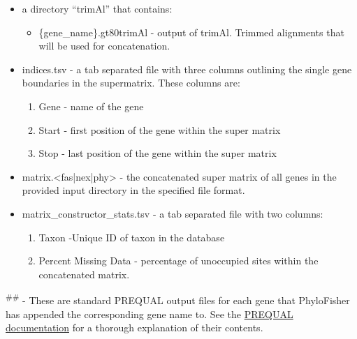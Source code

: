 \documentclass{article}
\begin{document}
\begin{description}
\begin{description}
\begin{itemize}
\begin{itemize}
\begin{itemize}
\begin{itemize}
                            \end{itemize}
                            \item a directory “trimAl” that contains:
                            \begin{itemize}
                                \item \{gene\_name\}.gt80trimAl - output of trimAl. Trimmed alignments that will be used for concatenation.
                            \end{itemize}
                            \item indices.tsv - a tab separated file with three columns outlining the single gene boundaries in the supermatrix. These columns are:
                            \begin{enumerate}
                                \item Gene - name of the gene
                                \item Start - first position of the gene within the super matrix
                                \item Stop - last position of the gene within the super matrix
                            \end{enumerate}
                            \item matrix.<fas|nex|phy> - the concatenated super matrix of all genes in the provided input directory in the specified file format.
                            \item matrix\_constructor\_stats.tsv - a tab separated file with two columns:
                            \begin{enumerate}
                                \item Taxon -Unique ID of taxon in the database
                                \item Percent Missing Data - percentage of unoccupied sites within the concatenated matrix.
                            \end{enumerate}
                        \end{itemize}
                    \end{itemize}
                \end{itemize}
            \end{description}
        \vspace{0.2cm}
        \textsuperscript{\#\#} - These are standard PREQUAL output files for each gene that PhyloFisher has appended the corresponding gene name to. See the \href{http://amoeba.msstate.edu/phylofisher/pdfs/prequal.pdf}{PREQUAL documentation} for a thorough explanation of their contents.
        \vspace{0.2cm}
        

\end{description}
\end{document}
